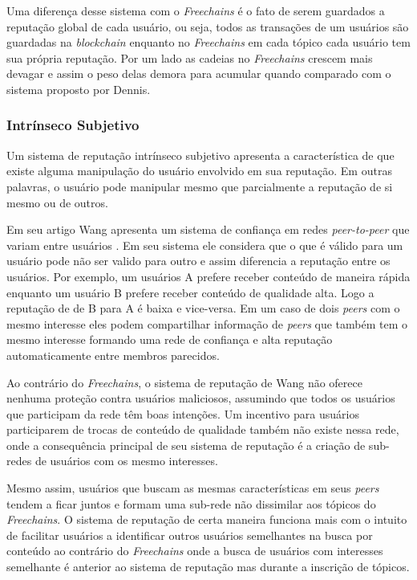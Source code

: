 \documentclass[12pt]{article}
\newcommand{\FC} {\emph{Freechains}\xspace}
\newcommand{\PtoP} {\emph{peer-to-peer}\xspace}
\begin{document}
Uma diferença desse sistema com o \FC é o fato de serem guardados a reputação global de cada usuário, ou seja, todos as transações de um usuários são guardadas na \emph{blockchain} enquanto no \FC em cada tópico cada usuário tem sua própria reputação. Por um lado as cadeias no \FC crescem mais devagar e assim o peso delas demora para acumular quando comparado com o sistema proposto por Dennis.

\subsubsection{Intrínseco Subjetivo} \label{subsub:intsub}

Um sistema de reputação intrínseco subjetivo apresenta a característica de que existe alguma manipulação do usuário envolvido em sua reputação. Em outras palavras, o usuário pode manipular mesmo que parcialmente a reputação de si mesmo ou de outros.

Em seu artigo Wang apresenta um sistema de confiança em redes \PtoP que variam entre usuários \cite{1231515}. Em seu sistema ele considera que o que é válido para um usuário pode não ser valido para outro e assim diferencia a reputação entre os usuários. Por exemplo, um usuários A prefere receber conteúdo de maneira rápida enquanto um usuário B prefere receber conteúdo de qualidade alta. Logo a reputação de de B para A é baixa e vice-versa. Em um caso de dois \emph{peers} com o mesmo interesse eles podem compartilhar informação de \emph{peers} que também tem o mesmo interesse formando uma rede de confiança e alta reputação automaticamente entre membros parecidos.

Ao contrário do \FC, o sistema de reputação de Wang não oferece nenhuma proteção contra usuários maliciosos, assumindo que todos os usuários que participam da rede têm boas intenções. Um incentivo para usuários participarem de trocas de conteúdo de qualidade também não existe nessa rede, onde a consequência principal de seu sistema de reputação é a criação de sub-redes de usuários com os mesmo interesses.

Mesmo assim, usuários que buscam as mesmas características em seus \emph{peers} tendem a ficar juntos e formam uma sub-rede não dissimilar aos tópicos do \FC. O sistema de reputação de certa maneira funciona mais com o intuito de facilitar usuários a identificar outros usuários semelhantes na busca por conteúdo ao contrário do \FC onde a busca de usuários com interesses semelhante é anterior ao sistema de reputação mas durante a inscrição de tópicos.
\end{document}
